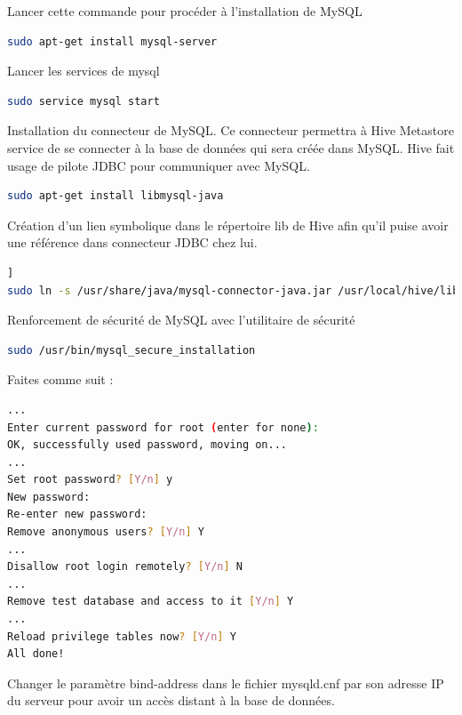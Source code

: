 \documentclass[12pt,french]{book}
\begin{document}
Lancer cette commande pour procéder à l’installation de MySQL

\begin{lstlisting}[language=bash, frame=single]
sudo apt-get install mysql-server
\end{lstlisting}

Lancer les services de mysql

\begin{lstlisting}[language=bash, frame=single]
sudo service mysql start
\end{lstlisting}

Installation du connecteur de MySQL.
Ce connecteur permettra à Hive Metastore service de se connecter à la base de données qui sera créée dans MySQL.
Hive fait usage de pilote JDBC pour communiquer avec MySQL.

\begin{lstlisting}[language=bash, frame=single]
sudo apt-get install libmysql-java
\end{lstlisting}

Création d’un lien symbolique dans le répertoire lib de Hive afin qu’il puise avoir une référence dans connecteur JDBC chez lui.

\begin{lstlisting}[language=bash, frame=single, breaklines=true, postbreak=\mbox{\textcolor{red}{$\hookrightarrow$}\space}]]
sudo ln -s /usr/share/java/mysql-connector-java.jar /usr/local/hive/lib/mysql-connector-java.jar
\end{lstlisting}

Renforcement de sécurité de MySQL avec l’utilitaire de sécurité

\begin{lstlisting}[language=bash, frame=single]
sudo /usr/bin/mysql_secure_installation
\end{lstlisting}

Faites comme suit :

\begin{lstlisting}[language=bash, frame=single]
...
Enter current password for root (enter for none):
OK, successfully used password, moving on...
...
Set root password? [Y/n] y
New password:
Re-enter new password:
Remove anonymous users? [Y/n] Y
...
Disallow root login remotely? [Y/n] N
...
Remove test database and access to it [Y/n] Y
...
Reload privilege tables now? [Y/n] Y
All done!
\end{lstlisting}

Changer le paramètre bind-address dans le fichier mysqld.cnf par son adresse IP du serveur pour avoir un accès distant à la base de données.
\end{document}

